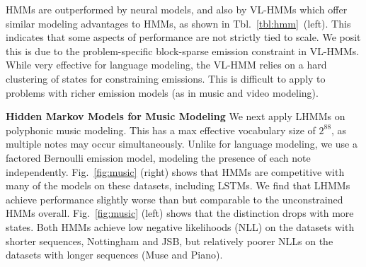 \documentclass{article}
\begin{document}

HMMs are outperformed by neural models,
and also by VL-HMMs \citep{chiu2020scaling} which offer similar modeling advantages to HMMs,
as shown in Tbl.~\ref{tbl:hmm}~(left).
This indicates that some aspects of performance are not strictly tied to scale. 
We posit this is due to the problem-specific block-sparse emission constraint in VL-HMMs. While 
very effective for language modeling,
the VL-HMM relies on a hard clustering of states for constraining emissions. 
This is difficult to apply to problems with richer emission models (as in music and video modeling).


\textbf{Hidden Markov Models for Music Modeling}
We next apply LHMMs on polyphonic music modeling. This has a max effective vocabulary size of $2^{88}$, as multiple notes may occur simultaneously. Unlike for language modeling, we use a factored Bernoulli emission model, modeling the presence of each note independently. Fig.~\ref{fig:music} (right) shows that HMMs are competitive with many of the models on these datasets, including LSTMs.
We find that LHMMs achieve performance slightly worse than but comparable to the unconstrained HMMs overall.
Fig.~\ref{fig:music} (left) shows that the distinction drops with more states. Both HMMs achieve low negative likelihoods (NLL) on the datasets with shorter sequences, Nottingham and JSB, but relatively poorer NLLs on the datasets with longer sequences (Muse and Piano).
\end{document}
